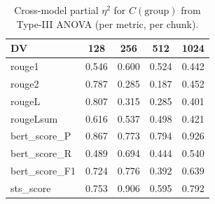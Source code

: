 \begin{table}[H]
\centering
\caption{Cross-model partial $\eta^2$ for $C(\mathrm{group})$ from Type-III ANOVA (per metric, per chunk).}
\label{tab:cross-anova-eta}
\small
\begin{tabular}{lcccc}
\toprule
DV & 128 & 256 & 512 & 1024 \\
\midrule
rouge1 & 0.546 & 0.600 & 0.524 & 0.442 \\
rouge2 & 0.787 & 0.285 & 0.187 & 0.452 \\
rougeL & 0.807 & 0.315 & 0.285 & 0.401 \\
rougeLsum & 0.616 & 0.537 & 0.498 & 0.421 \\
bert\_score\_P & 0.867 & 0.773 & 0.794 & 0.926 \\
bert\_score\_R & 0.489 & 0.694 & 0.444 & 0.540 \\
bert\_score\_F1 & 0.724 & 0.776 & 0.392 & 0.639 \\
sts\_score & 0.753 & 0.906 & 0.595 & 0.792 \\
\bottomrule
\end{tabular}
\end{table}
